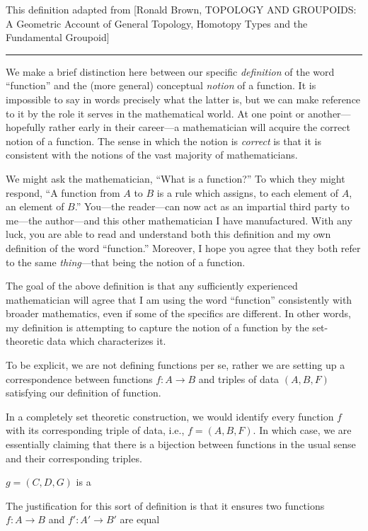 \documentclass[12pt]{article}
\newcommand{\sepline}{\rule{\textwidth}{0.4pt}}
\theoremstyle{definition}
\newcommand{\<}{\left\langle}
\renewcommand{\>}{\right\rangle}
\renewcommand{\_}[1]{{_{#1}}}
\begin{document}
This definition adapted from [Ronald Brown, TOPOLOGY AND
GROUPOIDS: A Geometric Account of General Topology,
Homotopy Types and the Fundamental Groupoid]

\sepline

We make a brief distinction here between our specific \emph{definition} of the word ``function'' and the (more general) conceptual \emph{notion} of a function.
It is impossible to say in words precisely what the latter is, but we can make reference to it by the role it serves in the mathematical world.
At one point or another---hopefully rather early in their career---a mathematician will acquire the correct notion of a function.
The sense in which the notion is \emph{correct} is that it is consistent with the notions of the vast majority of mathematicians.


We might ask the mathematician, ``What is a function?''
To which they might respond, ``A function from $A$ to $B$ is a rule which assigns, to each element of $A$, an element of $B$.''
You---the reader---can now act as an impartial third party to me---the author---and this other mathematician I have manufactured.
With any luck, you are able to read and understand both this definition and my own definition of the word ``function.''
Moreover, I hope you agree that they both refer to the same \emph{thing}---that being the notion of a function.


The goal of the above definition is that any sufficiently experienced mathematician will agree that I am using the word ``function'' consistently with broader mathematics, even if some of the specifics are different.
In other words, my definition is attempting to capture the notion of a function by the set-theoretic data which characterizes it.


To be explicit, we are not defining functions per se, rather we are setting up a correspondence between functions $f : A \to B$ and triples of data $(A, B, F)$ satisfying our definition of function.

In a completely set theoretic construction, we would identify every function $f$ with its corresponding triple of data, i.e., $f = (A, B, F)$.
In which case, we are essentially claiming that there is a bijection between functions in the usual sense and their corresponding triples.

$g = (C, D, G)$ is a 


The justification for this sort of definition is that it ensures two functions $f : A \to B$ and $f' : A' \to B'$ are equal
\end{document}
